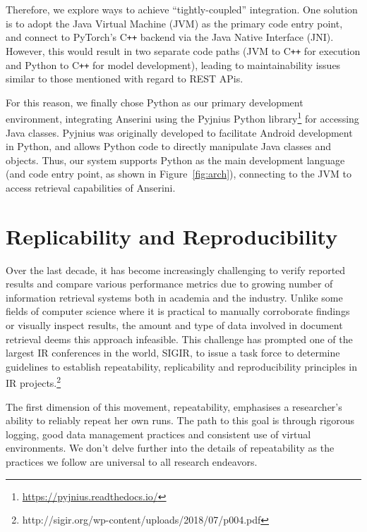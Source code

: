 Therefore, we explore ways to achieve ``tightly-coupled'' integration.
One solution is to adopt the Java Virtual Machine (JVM) as the primary code entry point, and connect to PyTorch's C\texttt{++} backend via the Java Native Interface (JNI).
However, this would result in two separate code paths (JVM to C\texttt{++} for execution and Python to C\texttt{++} for model development), leading to maintainability issues similar to those mentioned with regard to REST APis.

For this reason, we finally chose Python as our primary development environment, integrating Anserini using the Pyjnius Python library\footnote{\url{https://pyjnius.readthedocs.io/}} for accessing Java classes.
Pyjnius was originally developed to facilitate Android development in Python, and allows Python code to directly manipulate Java classes and objects.
Thus, our system supports Python as the main development language (and code entry point, as shown in Figure~\ref{fig:arch}), connecting to the JVM to access retrieval capabilities of Anserini.

\section{Replicability and Reproducibility}

Over the last decade, it has become increasingly challenging to verify reported results and compare various performance metrics due to growing number of information retrieval systems both in academia and the industry.
Unlike some fields of computer science where it is practical to manually corroborate findings or visually inspect results, the amount and type of data involved in document retrieval deems this approach infeasible.
This challenge has prompted one of the largest IR conferences in the world, SIGIR, to issue a task force to determine guidelines to establish repeatability, replicability and reproducibility principles in IR projects.\footnote{http://sigir.org/wp-content/uploads/2018/07/p004.pdf}

The first dimension of this movement, repeatability, emphasises a researcher's ability to reliably repeat her own runs.
The path to this goal is through rigorous logging, good data management practices and consistent use of virtual environments.
We don't delve further into the details of repeatability as the practices we follow are universal to all research endeavors.

